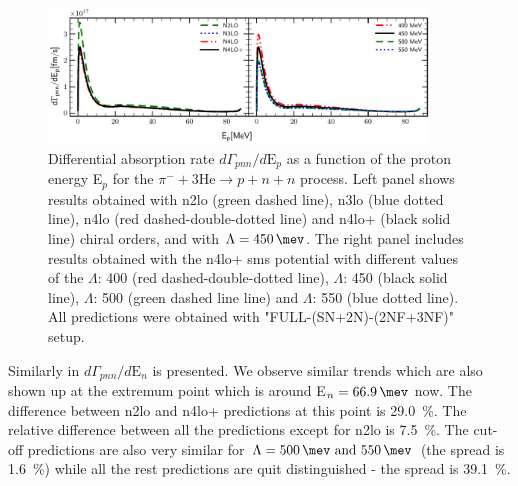    \begin{figure}[h]
        \begin{center}
        \includegraphics[width=0.9\textwidth]{PlotData/PION/Dalitz_maps/figures/3HE_dGdEp.pdf}
        \end{center}
        \caption{Differential absorption rate $d\Gamma_{pnn} /d\text{E}_p$ 
        as a function of the proton energy E$_p$ for the 
        $\pi^- + 3\text{He} \rightarrow p + n + n$ process.
        Left panel shows results obtained with \gls{n2lo} (green dashed line),
        \gls{n3lo} (blue dotted line), \gls{n4lo} (red dashed-double-dotted line)
        and \gls{n4lo+} (black solid line) chiral orders, and with $\Lambda = \SI{450}{\mev}$.
        The right panel includes results obtained with the \gls{n4lo+} \gls{sms} potential
        with different values of the $\Lambda$: \SI{400}{\mev} (red dashed-double-dotted line),
        $\Lambda$: \SI{450}{\mev} (black solid line),
        $\Lambda$: \SI{500}{\mev} (green dashed line line) and
        $\Lambda$: \SI{550}{\mev} (blue dotted line).
        All predictions were obtained with "FULL-(SN+2N)-(2NF+3NF)" setup.}
        \label{pion_GdEp}
    \end{figure}

    Similarly in  $d\Gamma_{pnn} /d\text{E}_n$ is presented. We observe similar trends
    which are also shown up at the extremum point which is around E$_n = \SI{66.9}{\mev}$ now.
    The difference between \gls{n2lo} and \gls{n4lo+} predictions at this point is \SI{29.0}{\percent}.
    The relative difference between all the predictions except for \gls{n2lo}
    is \SI{7.5}{\percent}.
    The cut-off predictions are also very similar for $\Lambda=\SIlist{500;550}{\mev}$ (the spread is \SI{1.6}{\percent})
    while all the rest predictions are quit distinguished - the spread is \SI{39.1}{\percent}.


